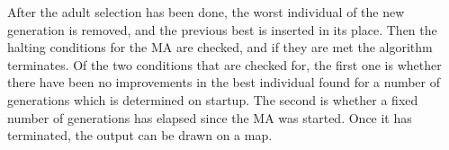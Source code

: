 After the adult selection has been done, the worst individual of the new generation is removed, and the previous best is inserted in its place. Then the halting conditions for the MA are checked, and if they are met the algorithm terminates. Of the two conditions that are checked for, the first one is whether there have been no improvements in the best individual found for a number of generations which is determined on startup. The second is whether a fixed number of generations has elapsed since the MA was started. Once it has terminated, the output can be drawn on a map.













